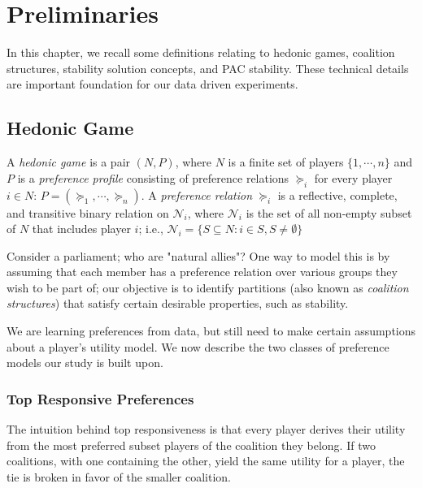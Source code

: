 
\chapter{Preliminaries}
\label{ch:preliminaries}
\vspace{2em}

In this chapter, we recall some definitions relating to hedonic games,
coalition structures, stability solution concepts, and PAC stability.
These technical details are important foundation for our data driven experiments.

\section{Hedonic Game}
\label{sec:hedonic_game}
A \textit{hedonic game} is a pair $(N, P)$, where $N$ is a finite set of players
$\{1, \cdots, n\}$ and $P$ is a \textit{preference profile} consisting of
preference relations $\succeq_i$ for every player $i \in N$:
$P = (\succeq_1, \cdots, \succeq_n)$.
A \textit{preference relation} $\succeq_i$ is a reflective, complete, and
transitive binary relation on $\mathcal{N}_i$, where $\mathcal{N}_i$ is the set
of all non-empty subset of $N$ that includes player $i$;
i.e., $\mathcal{N}_i = \{S \subseteq N: i \in S, S \neq \emptyset \}$

Consider a parliament; who are "natural allies"? One way to model this is by
assuming that each member has a preference relation over various groups they
wish to be part of; our objective is to identify partitions
(also known as \textit{coalition structures}) that satisfy certain desirable
properties, such as stability.

We are learning preferences from data, but still need to make certain
assumptions about a player's utility model.
We now describe the two classes of preference models our study is built upon.

\subsection{Top Responsive Preferences}
\label{subsec:top_responsive_preferences}
The intuition behind top responsiveness is that every player derives their
utility from the most preferred subset players of the coalition they belong.
If two coalitions, with one containing the other, yield the same utility for
a player, the tie is broken in favor of the smaller coalition.

